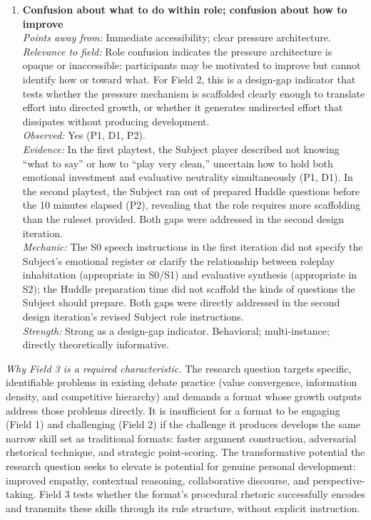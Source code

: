 \begin{enumerate}
\item \textbf{Confusion about what to do within role; confusion about how to improve}\\
\textit{Points away from:} Immediate accessibility; clear pressure architecture.\\
\textit{Relevance to field:} Role confusion indicates the pressure architecture is opaque or inaccessible: participants may be motivated to improve but cannot identify how or toward what. For Field 2, this is a design-gap indicator that tests whether the pressure mechanism is scaffolded clearly enough to translate effort into directed growth, or whether it generates undirected effort that dissipates without producing development.\\
\textit{Observed:} Yes (P1, D1, P2).\\
\textit{Evidence:} In the first playtest, the Subject player described not knowing ``what to say'' or how to ``play very clean,'' uncertain how to hold both emotional investment and evaluative neutrality simultaneously (P1, D1). In the second playtest, the Subject ran out of prepared Huddle questions before the 10 minutes elapsed (P2), revealing that the role requires more scaffolding than the ruleset provided. Both gaps were addressed in the second design iteration.\\
\textit{Mechanic:} The S0 speech instructions in the first iteration did not specify the Subject's emotional register or clarify the relationship between roleplay inhabitation (appropriate in S0/S1) and evaluative synthesis (appropriate in S2); the Huddle preparation time did not scaffold the kinds of questions the Subject should prepare. Both gaps were directly addressed in the second design iteration's revised Subject role instructions.\\
\textit{Strength:} Strong as a design-gap indicator. Behavioral; multi-instance; directly theoretically informative.

\end{enumerate}

\bigskip


\noindent\textit{Why Field 3 is a required characteristic.} The research question targets specific, identifiable problems in existing debate practice (value convergence, information density, and competitive hierarchy) and demands a format whose growth outputs address those problems directly. It is insufficient for a format to be engaging (Field 1) and challenging (Field 2) if the challenge it produces develops the same narrow skill set as traditional formats: faster argument construction, adversarial rhetorical technique, and strategic point-scoring. The transformative potential the research question seeks to elevate is potential for genuine personal development: improved empathy, contextual reasoning, collaborative discourse, and perspective-taking. Field 3 tests whether the format's procedural rhetoric successfully encodes and transmits these skills through its rule structure, without explicit instruction.

